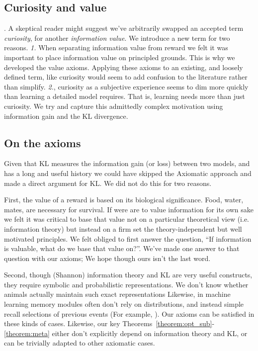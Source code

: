 \documentclass[9pt,twocolumn,twoside]{pnas-new}
\begin{document}
\subsection*{Curiosity and value}.
A skeptical reader might suggest we've arbitrarily swapped an accepted term \textit{curiosity}, for another \textit{information value}. We introduce a new term for two reasons. \textit{1.} When separating information value from reward we felt it was important to place information value on principled grounds. This is why we developed the value axioms. Applying these axioms to an existing, and loosely defined term, like curiosity would seem to add confusion to the literature rather than simplify. \textit{2.}, curiosity as a subjective experience seems to dim more quickly than learning a detailed model requires. That is, learning needs more than just curiosity. We try and capture this admittedly complex motivation using information gain and the KL divergence.

\subsection*{On the axioms} 
Given that KL measures the information gain (or loss) between two models, and has a long and useful history %
we could have skipped the Axiomatic approach and made a direct argument for KL. We did not do this for two reasons. 

First, the value of a reward is based on its biological significance. Food, water, mates, are necessary for survival. If were are to value information for its own sake we felt it was critical to base that value not on a particular theoretical view (i.e. information theory) but instead on a firm set the theory-independent but well motivated principles. We felt obliged to first answer the question, ``If information is valuable, what do we base that value on?''. We've made one answer to that question with our axioms; We hope though ours isn't the last word.

Second, though (Shannon) information theory and KL are very useful constructs, they require symbolic and probabilistic representations. We don't know whether animals actually maintain such exact representations %
Likewise, in machine learning memory modules often don't rely on distributions, and instead simple recall selections of previous events (For example, \cite{Min2016}). 
Our axioms can be satisfied in these kinds of cases. Likewise, our key Theorems~\ref{theorem:opt_sub}-\ref{theorem:meta} either don't explicitly depend on information theory and KL, or can be trivially adapted to other axiomatic cases.
\end{document}
